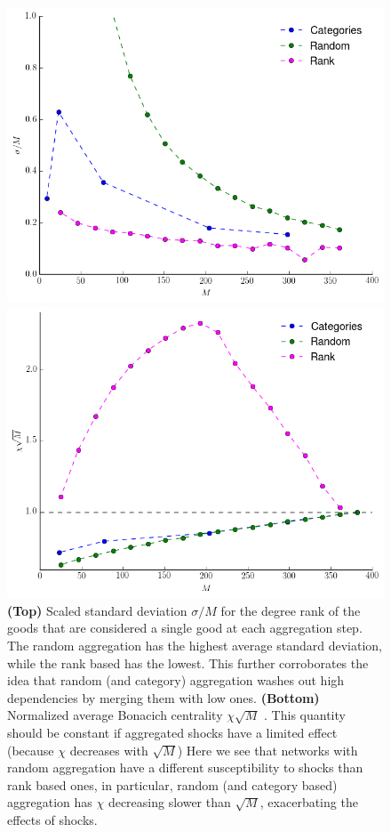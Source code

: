 \begin{figure}[!ht]
  \centering
  \includegraphics[width=.85\textwidth]{figs_io/cv_degree.png}
  
  \includegraphics[width=.85\textwidth]{figs_io/susc_data.png}
  
  \caption{\textbf{(Top)} Scaled standard deviation $\sigma / M$ for
    the degree rank of the goods that are considered a single good at
    each aggregation step. The random aggregation has the highest
    average standard deviation, while the rank based has the
    lowest. This further corroborates the idea that random (and
    category) aggregation washes out high dependencies by merging them
    with low ones. \textbf{(Bottom)} Normalized average Bonacich
    centrality $\chi\sqrt{M}$ \cite{Acemoglu12}. This quantity should
    be constant if aggregated shocks have a limited effect (because
    $\chi$ decreases with $\sqrt{M}$) Here we see that networks with
    random aggregation have a different susceptibility to shocks than
    rank based ones, in particular, random (and category based)
    aggregation has $\chi$ decreasing slower than $\sqrt{M}$,
    exacerbating the effects of shocks.}
  \label{fig:chi}
\end{figure}


